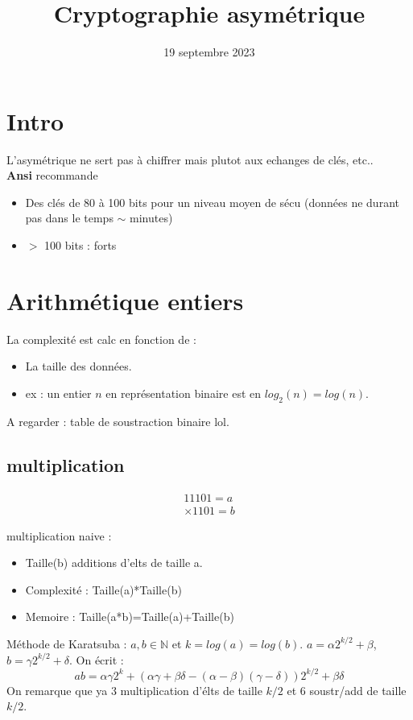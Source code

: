 \documentclass[12pt]{article}
\theoremstyle{plain}
\theoremstyle{definition}
\newcommand{\N}{\mathbb{N}}
\begin{document}
\title{Cryptographie asymétrique}
\date{19 septembre 2023}
\maketitle

\section{Intro}
L'asymétrique ne sert pas à chiffrer mais plutot aux echanges de clés, etc..\\
\textbf{Ansi} recommande 
\begin{itemize}
    \item Des clés de 80 à 100 bits pour un niveau moyen de sécu (données ne durant pas dans le temps $\sim$ minutes)
    \item $>$ 100 bits : forts
\end{itemize}

\section{Arithmétique entiers}
La complexité est calc en fonction de :
\begin{itemize}
    \item La taille des données.
    \item ex : un entier $n$ en représentation binaire est en $log_2(n)=log(n)$.
\end{itemize}

A regarder : table de soustraction binaire lol.\\

\subsection{multiplication}
\begin{align*}
    && 11101=a&&\\
    &&\times 1101=b
\end{align*}

multiplication naive :
\begin{itemize}
    \item Taille(b) additions d'elts de taille a.
    \item Complexité : Taille(a)*Taille(b)
    \item Memoire : Taille(a*b)=Taille(a)+Taille(b)
\end{itemize}

Méthode de Karatsuba : $a,b\in \N$ et $k=log(a)=log(b)$. $a=\alpha2^{k/2}+\beta$, $b=\gamma2^{k/2}+\delta$. On écrit :
$$ab=\alpha\gamma2^k+(\alpha\gamma+\beta\delta-(\alpha-\beta)(\gamma-\delta))2^{k/2}+\beta\delta$$
On remarque que ya 3 multiplication d'élts de taille $k/2$ et $6$ soustr/add de taille $k/2$.\\
\end{document}
